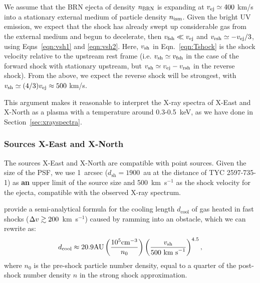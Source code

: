 \documentclass[linenumbers]{aastex631}
\begin{document}

We assume that the BRN ejecta of density $n_{\rm BRN}$ is expanding at $v_{\rm ej} \simeq 400$ km/s into a stationary external medium of particle density $n_{\rm ism}$. Given the bright UV emission, we expect that the shock has already swept up considerable gas from the external medium and begun to decelerate, then $v_{\rm fsh} \ll v_{\rm ej}$ and $v_{\rm rsh} \simeq -v_{\rm ej}/3$, using Eqns~\ref{eqn:vsh1} and \ref{eqn:vsh2}.  Here, $v_{\rm sh}$ in Eqn.~\ref{eqn:Tshock} is the shock velocity relative to the upstream rest frame (i.e. $v_{\rm sh} \simeq v_{\rm fsh}$ in the case of the forward shock with stationary upstream, but $v_{\rm sh} \simeq v_{\rm ej}-v_{\rm rsh}$ in the reverse shock).  From the above, we expect the reverse shock will be strongest, with $v_{\rm sh} \simeq (4/3)v_{\rm ej} \approx 500$ km/s.

This argument makes it reasonable to interpret the X-ray spectra of X-East and X-North as a plasma with a temperature around 0.3-0.5~keV, as we have done in Section~\ref{sec:xrayspectra}.

\subsubsection{Sources X-East and X-North}
\label{sec:xEN}
The sources X-East and X-North are compatible with point sources. Given the size of the PSF, we use 1~arcsec ($d_\mathrm{sh}=1900$~au at the distance of TYC 2597-735-1) as \textbf{an} upper limit of the source size and 500~km~s$^{-1}$ as the shock velocity for the ejecta, compatible with the observed X-ray spectrum.

\citet{2002ApJ...576L.149R} provide a
semi-analytical formula for the cooling length
$d_{\mathrm{cool}}$ of gas
heated in fast shocks ($\Delta v \gtrsim 200$~km~s$^{-1}$) caused by ramming into an obstacle,
which we can rewrite as:
\begin{equation}
d_{\mathrm{cool}} \approx 20.9 \mathrm{ AU}
    \left(\frac{10^5\mathrm{ cm}^{-3}}{n_0}\right)
    \left(\frac{v_{\mathrm{sh}}}{500\textnormal{ km s}^{-1}}\right)^{4.5},
\label{raga}
\end{equation}
where $n_0$ is the pre-shock particle number density, equal to a
quarter of the post-shock number density $n$ in the strong shock
approximation.
\end{document}
